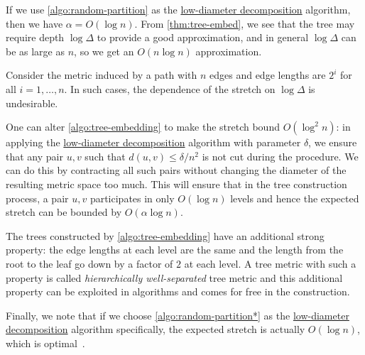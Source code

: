 If we use \autoref{algo:random-partition} as the \hyperref[def:low-diameter-decomposition]{low-diameter decomposition} algorithm, then we have \(\alpha = O(\log n)\). From \autoref{thm:tree-embed}, we see that the tree may require depth \(\log \Delta \) to provide a good approximation, and in general \(\log \Delta \) can be as large as \(n\), so we get an \(O(n \log n)\) approximation.

\begin{eg}
	Consider the metric induced by a path with \(n\) edges and edge lengths are \(2^i\) for all \(i = 1, \dots , n\). In such cases, the dependence of the stretch on \(\log \Delta \) is undesirable.
\end{eg}

One can alter \autoref{algo:tree-embedding} to make the stretch bound \(O(\log ^2 n)\): in applying the \hyperref[def:low-diameter-decomposition]{low-diameter decomposition} algorithm with parameter \(\delta \), we ensure that any pair \(u, v\) such that \(d(u, v) \leq \delta / n^2\) is not cut during the procedure. We can do this by contracting all such pairs without changing the diameter of the resulting metric space too much. This will ensure that in the tree construction process, a pair \(u, v\) participates in only \(O(\log n)\) levels and hence the expected stretch can be bounded by \(O(\alpha \log n)\).

\begin{remark}
	The trees constructed by \autoref{algo:tree-embedding} have an additional strong property: the edge lengths at each level are the same and the length from the root to the leaf go down by a factor of \(2\) at each level. A tree metric with such a property is called \emph{hierarchically well-separated} tree metric and this additional property can be exploited in algorithms and comes for free in the construction.
\end{remark}

Finally, we note that if we choose \autoref{algo:random-partition*} as the \hyperref[def:low-diameter-decomposition]{low-diameter decomposition} algorithm specifically, the expected stretch is actually \(O(\log n)\), which is optimal~\cite{fakcharoenphol2003tight}.

